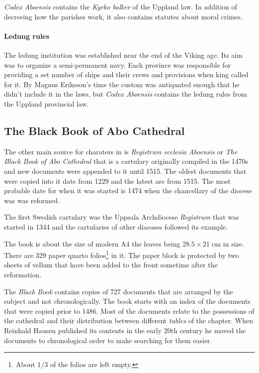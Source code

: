 \documentclass[a4paper]{article}
\begin{document}
\emph{Codex Aboensis} contains the \emph{Kyrko balker} of the Uppland
law. In addition of decreeing how the parishes work, it also contains
statutes about moral crimes.


\paragraph{Ledung rules}

The ledung institution was established near the end of the Viking age.
Its aim was to organize a semi-permanent navy. Each province was
responsible for providing a set number of ships and their crews and
provisions when king called for it. By Magnus Eriksson's time the
custom was antiquated enough that he didn't include it in the laws,
but \emph{Codex Aboensis} contains the ledung rules from the Uppland
provincial law.


\subsection{The Black Book of Abo Cathedral}

The other main source for charaters in \Aboensis{} is \emph{Registrum
  ecclesia Aboensis} or \emph{The Black Book of Abo Cathedral} that is
a cartulary originally compiled in the 1470s and new documents were
appended to it until 1515. The oldest documents that were copied into
it date from 1229 and the latest are from 1515. The most probable date
for when it was started is 1474 when the chancellary of the diocese
was was reformed.

The first Swedish cartulary was the Uppsala Archdiocese
\emph{Registrum} that was started in 1344 and the cartularies of other
diacoses followed its example. 

The book is about the size of modern A4 the leaves being $28.5 \times
21$ cm in size. There are 329 paper quarto folios\footnote{About 1/3
  of the folios are left empty.} in it. The paper block is protected
by two sheets of vellum that have been added to the front sometime
after the reformation.

The \emph{Black Book} contains copies of 727 documents that are
arranged by the subject and not chronologically. The book starts with
an index of the documents that were copied prior to 1486. Most of the
documents relate to the possessions of the cathedral and their
distribution between different \emph{tables} of the chapter. When
Reinhald Hausen published its contents in the early 20th century he
moved the documents to chronological order to make searching for them
easier.
\end{document}
